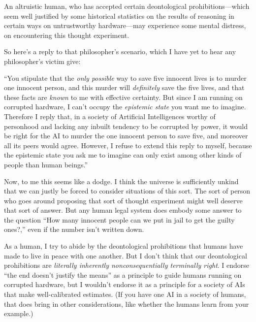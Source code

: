  An altruistic human, who has accepted certain deontological
prohibitions---which seem well justified by some historical statistics
on the results of reasoning in certain ways on untrustworthy
hardware---may experience some mental distress, on encountering this
thought experiment.


 So here's a reply to that
philosopher's scenario, which I have yet to hear any
philosopher's victim give:


 ``You stipulate that the \textit{only possible}
way to save five innocent lives is to murder one innocent person, and
this murder will \textit{definitely} save the five lives, and that
these facts are \textit{known} to me with effective certainty. But
since I am running on corrupted hardware, I can't
occupy the \textit{epistemic state} you want me to imagine. Therefore I
reply that, in a society of Artificial Intelligences worthy of
personhood and lacking any inbuilt tendency to be corrupted by power,
it would be right for the AI to murder the one innocent person to save
five, and moreover all its peers would agree. However, I refuse to
extend this reply to myself, because the epistemic state you ask me to
imagine can only exist among other kinds of people than human
beings.''


 Now, to me this seems like a dodge. I think the universe is
sufficiently unkind that we can justly be forced to consider situations
of this sort. The sort of person who goes around proposing that sort of
thought experiment might well deserve that sort of answer. But any
human legal system does embody some answer to the question
``How many innocent people can we put in jail to get
the guilty ones?,'' even if the number
isn't written down.


 As a human, I try to abide by the deontological prohibitions that
humans have made to live in peace with one another. But I
don't think that our deontological prohibitions are
\textit{literally inherently nonconsequentially terminally right}. I
endorse ``the end doesn't justify the
means'' as a principle to guide humans running on
corrupted hardware, but I wouldn't endorse it as a
principle for a society of AIs that make well-calibrated estimates. (If
you have one AI in a society of humans, that does bring in other
considerations, like whether the humans learn from your example.)


